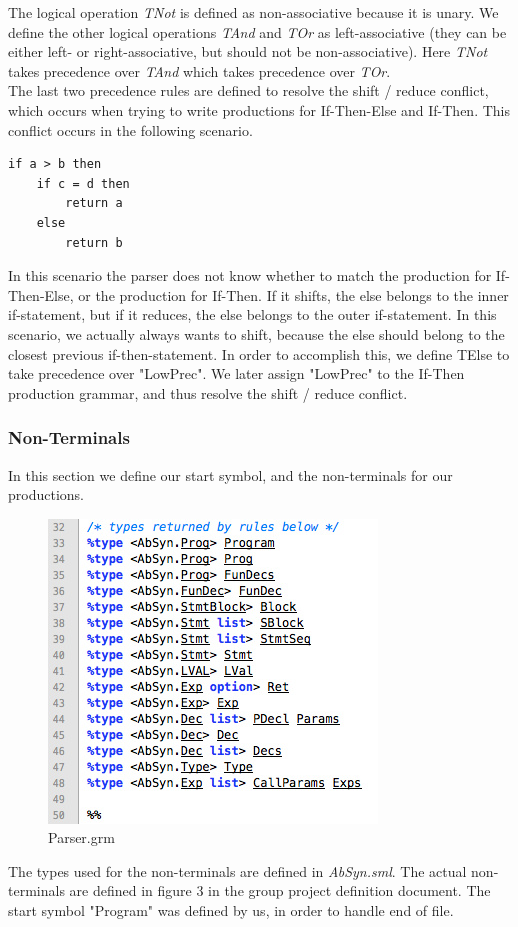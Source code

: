 \documentclass[12pt,a4paper,english]{article}
\begin{document}
The logical operation \textit{TNot} is defined as non-associative because it is unary. We define the other logical operations \textit{TAnd} and \textit{TOr} as left-associative (they can be either left- or right-associative, but should not be non-associative). Here \textit{TNot} takes precedence over \textit{TAnd} which takes precedence over \textit{TOr}. \\

The last two precedence rules are defined to resolve the shift / reduce conflict, which occurs when trying to write productions for If-Then-Else and If-Then. This conflict occurs in the following scenario. 
\begin{lstlisting}
if a > b then
    if c = d then
        return a
    else
        return b
\end{lstlisting}
In this scenario the parser does not know whether to match the production for If-Then-Else, or the production for If-Then. If it shifts, the else belongs to the inner if-statement, but if it reduces, the else belongs to the outer if-statement. In this scenario, we actually always wants to shift, because the else should belong to the closest previous if-then-statement. In order to accomplish this, we define TElse to take precedence over "LowPrec". We later assign "LowPrec" to the If-Then production grammar, and thus resolve the shift / reduce conflict.

\subsubsection{Non-Terminals}

In this section we define our start symbol, and the non-terminals for our productions. \\
\begin{figure}[h]\includegraphics[]{Types.jpg}\caption{Parser.grm}\end{figure}
The types used for the non-terminals are defined in \textit{AbSyn.sml}. The actual non-terminals are defined in figure 3 in the group project definition document. The start symbol "Program" was defined by us, in order to handle end of file.
\end{document}
